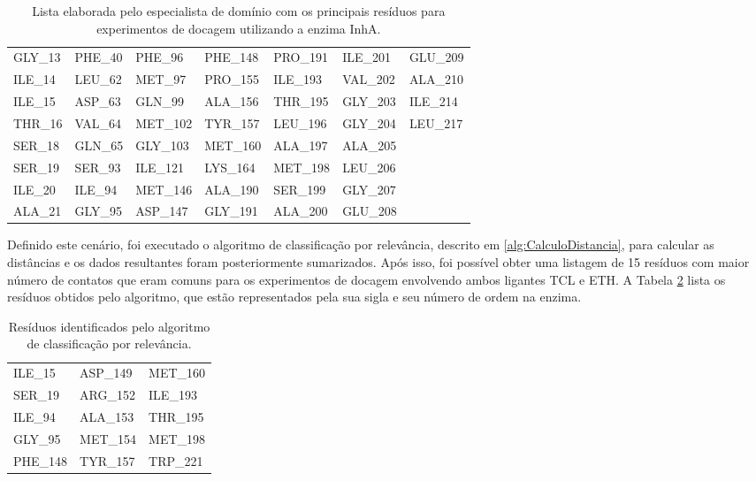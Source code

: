 \begin{table}[h]
\caption{Lista elaborada pelo especialista de domínio com os principais resíduos para experimentos de docagem utilizando a enzima InhA.}
\label{tab:listaOsmar}
\centering
\begin{tabular}{@{}lllllll@{}}
GLY\_13	&	PHE\_40 &	PHE\_96	&	PHE\_148 &	PRO\_191 &	ILE\_201 &	GLU\_209 		\\
ILE\_14	&	LEU\_62 &	MET\_97	&	PRO\_155 &	ILE\_193 &	VAL\_202 &	ALA\_210 		\\
ILE\_15	&	ASP\_63 &	GLN\_99	&	ALA\_156 &	THR\_195 &	GLY\_203 &	ILE\_214 		\\
THR\_16	&	VAL\_64 &	MET\_102 &	TYR\_157 &	LEU\_196 &	GLY\_204 &	LEU\_217 		\\
SER\_18	&	GLN\_65 &	GLY\_103 &	MET\_160 &	ALA\_197 &	ALA\_205 &					\\
SER\_19	&	SER\_93 &	ILE\_121 &	LYS\_164 &	MET\_198 &	LEU\_206 &					\\
ILE\_20	&	ILE\_94	&	MET\_146 &	ALA\_190 &	SER\_199 &	GLY\_207 &					\\
ALA\_21 &	GLY\_95	&	ASP\_147 &	GLY\_191 &	ALA\_200 &	GLU\_208 &					\\ 
\end{tabular}
\end{table}

Definido este cenário, foi executado o algoritmo de classificação por relevância, descrito em \ref{alg:CalculoDistancia}, para calcular as distâncias e os dados resultantes foram posteriormente sumarizados. Após isso, foi possível obter uma listagem de 15 resíduos com maior número de contatos que eram comuns para os experimentos de docagem envolvendo ambos ligantes TCL e ETH. A Tabela \ref{tab:listaProvavelRelevantes} lista os resíduos obtidos pelo algoritmo, que estão representados pela sua sigla e seu número de ordem na enzima.

\begin{table}[h]
\caption{Resíduos identificados pelo algoritmo de classificação por relevância.}
\label{tab:listaProvavelRelevantes}
\centering
\begin{tabular}{@{}lll@{}}
ILE\_15  & ASP\_149 & MET\_160 \\
SER\_19  & ARG\_152 & ILE\_193 \\
ILE\_94  & ALA\_153 & THR\_195 \\
GLY\_95  & MET\_154 & MET\_198 \\
PHE\_148 & TYR\_157 & TRP\_221 \\
\end{tabular}
\end{table}


